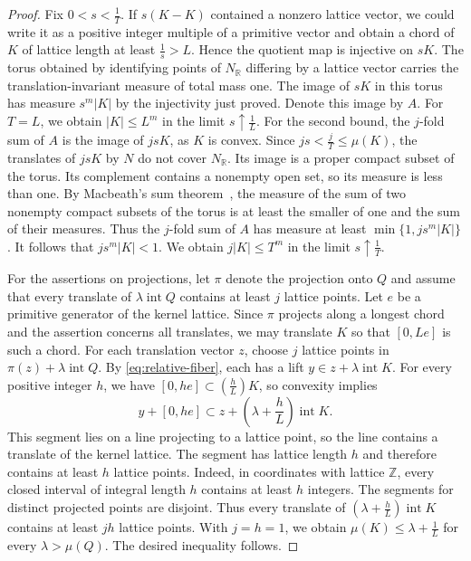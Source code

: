 \documentclass[reqno, 11pt]{article}
\numberwithin{equation}{section}
\theoremstyle{definition}
\newcommand{\R}{\mathbb R}
\DeclareMathOperator{\intr}{int}
\begin{document}
\begin{proof}
Fix $0<s<\frac{1}{T}$. If $s(K-K)$ contained a nonzero lattice vector,
we could write it as a positive integer multiple of a primitive
vector and obtain a chord of $K$ of lattice length at least
$\frac{1}{s}>L$. Hence the quotient map is injective on $sK$.
The torus obtained by identifying points of $N_\R$ differing by a
lattice vector carries the translation-invariant measure of total mass
one. The image of $sK$ in this torus has measure $s^m|K|$ by the
injectivity just proved. Denote this image by $A$.
For $T=L$, we obtain $|K|\le L^m$ in the limit $s\uparrow\frac{1}{L}$.
For the second bound, the $j$-fold sum of $A$ is the image of
$jsK$, as $K$ is convex. Since $js<\frac{j}{T}\le\mu(K)$,
the translates of $jsK$ by $N$ do not cover $N_\R$. Its image is a
proper compact subset of the torus. Its complement contains a nonempty
open set, so its measure is less than one.
By Macbeath's sum theorem~\cite{Macbeath}, the measure of the sum
of two nonempty compact subsets of the torus is at least the smaller
of one and the sum of their measures. Thus the $j$-fold sum of $A$
has measure at least $\min\{1,js^m|K|\}$. It follows that
$js^m|K|<1$. We obtain $j|K|\le T^m$ in the limit $s\uparrow\frac{1}{T}$.

For the assertions on projections, let $\pi$ denote the projection
onto $Q$ and assume that every translate of $\lambda\intr Q$ contains
at least $j$ lattice points. Let $e$ be a primitive generator of the
kernel lattice. Since $\pi$ projects along a longest chord and the
assertion concerns all translates, we may translate $K$ so that
$[0,Le]$ is such a chord.
For each translation vector $z$, choose $j$ lattice points in
$\pi(z)+\lambda\intr Q$. By \eqref{eq:relative-fiber}, each has a
lift $y\in z+\lambda\intr K$. For every positive integer $h$, we have
$[0,he]\subset(\frac{h}{L})K$, so convexity implies
\[
                       y+[0,he]\subset z+(\lambda+\frac{h}{L})\intr K.
\]
This segment lies on a line projecting to a lattice point, so the
line contains a translate of the kernel lattice. The segment has
lattice length $h$ and therefore
contains at least $h$ lattice points. Indeed, in coordinates with lattice
$\mathbb Z$, every closed interval of integral length $h$ contains
at least $h$ integers. The segments for distinct
projected points are disjoint. Thus every translate of
$(\lambda+\frac{h}{L})\intr K$ contains at least $jh$ lattice points.
With $j=h=1$, we obtain $\mu(K)\le\lambda+\frac{1}{L}$ for every
$\lambda>\mu(Q)$. The desired inequality follows.
\end{proof}
\end{document}
